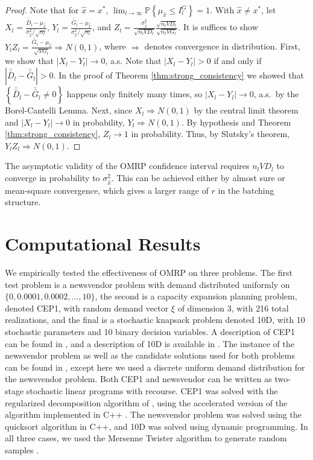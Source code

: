 \documentclass[11pt]{article}
\newcommand{\p}[1]{\mathbb{P} \left\{ #1 \right\}}
\newcommand{\x}{x} %
\newcommand{\xh}{{\hat{\x}}}
\newcommand{\xs}{\x^*}
\newcommand{\xit}{\xi}  %
\newcommand{\gb}{\bar{G}}
\newcommand{\gbb}{\bar{\gb}}
\newcommand{\db}{\bar{D}}
\newcommand{\dbb}{\bar{\db}}
\begin{document}
\begin{proof}
	Note that for $\xh = \xs$, $\lim_{l\rightarrow\infty} \p{\mu_\xh \leq I^G_l} = 1$.  
        With $\xh \neq \xs$, let $X_l = \frac{\dbb_l - \mu_\xh}{\sigma^2_\xh/\sqrt{n_l}}$, $Y_l = \frac{\gbb_l - \mu_\xh}{\sigma^2_\xh/\sqrt{n_l}}$, and $Z_l = \frac{\sigma^2_\xh}{\sqrt{n_lVD_l}} \frac{\sqrt{n_lVD_l}}{\sqrt{n_lVG_l}}$.  
        It is suffices to show $Y_lZ_l = \frac{\gbb_l - \mu_\xh}{\sqrt{VG_l}} \Rightarrow N(0,1)$, where $\Rightarrow$ denotes convergence in distribution.  
        First, we show that $|X_l - Y_l| \rightarrow 0$, a.s.  Note that $|X_l - Y_l| > 0$ if and only if $|\dbb_l - \gbb_l| > 0$.  
        In the proof of Theorem \ref{thm:strong_consistency} we showed that $\left\{ \dbb_l - \gbb_l \neq 0 \right\}$ happens only finitely many times, so $|X_l - Y_l| \rightarrow 0$, a.s.\ by the Borel-Cantelli Lemma. 
        Next, since $X_l \Rightarrow N(0,1)$  by the central limit theorem and $|X_l - Y_l| \rightarrow 0$ in probability, $Y_l \Rightarrow N(0,1)$.  
        By hypothesis and Theorem \ref{thm:strong_consistency}, $Z_l \rightarrow 1$ in probability.  
        Thus, by Slutsky's theorem, $Y_lZ_l \Rightarrow N(0,1)$.
\end{proof}

The asymptotic validity of the OMRP confidence interval requires $n_l VD_l$ to converge in probability to $\sigma^{2}_{\xh}$. 
This can be achieved either by almost sure or mean-square convergence, which gives a larger range of $r$ in the batching structure.

\section{Computational Results}
\label{sec:comp}

We empirically tested the effectiveness of OMRP on three problems. 
The first test problem is a newsvendor problem with demand distributed uniformly on $\{0, 0.0001, 0.0002, \dots, 10\}$, the second is a capacity expansion planning problem, denoted CEP1, with random demand vector $\xit$ of dimension 3, with 216 total realizations, and the final is a stochastic knapsack problem denoted 10D, with 10 stochastic parameters and 10 binary decision variables.  
A description of CEP1 can be found in \cite{higle1996}, and a description of 10D is available in \cite{kleywegt2002sample}. 
The instance of the newsvendor problem as well as the candidate solutions used for both problems can be found in \cite{Bayraksan2006}, except here we used a discrete uniform demand distribution for the newsvendor problem.  
Both CEP1 and newsvendor can be written as two-stage stochastic linear programs with recourse. 
CEP1 was solved with the regularized decomposition algorithm of \cite{ruszczynski1986regularized}, using the accelerated version of the algorithm implemented in C++ \cite{ruszczynski1997accelerating}. 
The newsvendor problem was solved using the quicksort algorithm in C++, and 10D was solved using dynamic programming.  
In all three cases, we used the Mersenne Twister algorithm to generate random samples \cite{wagner_twister_09}.
\end{document}
